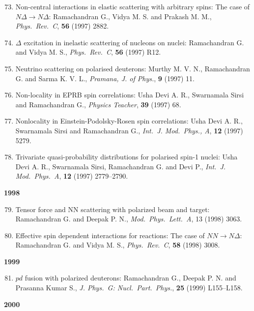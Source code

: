 \begin{enumerate}
\setcounter{enumi}{72}
\item Non-central interactions in elastic scattering with arbitrary spins: The case of $N\Delta\to N\Delta$: Ramachandran G., Vidya M. S. and Prakash M. M., \textit{Phys.\ Rev.\ C}, {\bf 56} (1997) 2882.
\item $\Delta$ excitation in inelastic scattering of nucleons on nuclei: Ramachandran G. and Vidya M. S., \textit{Phys.\ Rev.\ C}, {\bf 56} (1997) R12.
\item Neutrino scattering on polarised deuterons: Murthy M. V. N., Ramachandran G. and Sarma K. V. L., \textit{Pramana, J. of Phys.}, {\bf 9} (1997) 11.
\item Non-locality in EPRB spin correlations: Usha Devi A. R., Swarnamala Sirsi and Ramachandran G., \textit{Physics Teacher}, {\bf 39} (1997) 68.
\item Nonlocality in Einstein-Podolsky-Rosen spin correlations: Usha Devi A. R., Swarnamala Sirsi and Ramachandran G., \textit{Int.\ J. Mod.\ Phys., A}, {\bf 12} (1997) 5279.
\item Trivariate quasi-probability distributions for polarised spin-1 nuclei: Usha Devi A. R., Swarnamala Sirsi, Ramachandran G. and Devi P., \textit{Int.\ J. Mod.\ Phys.\ A}, {\bf 12} (1997) 2779--2790.
\end{enumerate}
\textbf{1998}
\begin{enumerate}
\setcounter{enumi}{78}
\item Tensor force and NN scattering with polarized beam and target: Ramachandran G. and Deepak P. N., \textit{Mod.\ Phys.\ Lett.\ A}, 13 (1998) 3063.
\item Effective spin dependent interactions for reactions: The case of $NN \to N\Delta$: Ramachandran G. and Vidya M. S., \textit{Phys.\ Rev.\ C}, {\bf 58} (1998) 3008.
\end{enumerate}
\textbf{1999}
\begin{enumerate}
\setcounter{enumi}{80}
\item $pd$ fusion with polarized deuterons: Ramachandran G., Deepak P. N. and Prasanna Kumar S., \textit{J. Phys.\ G: Nucl.\ Part.\ Phys.}, {\bf 25} (1999) L155--L158.
\end{enumerate}
\textbf{2000}
